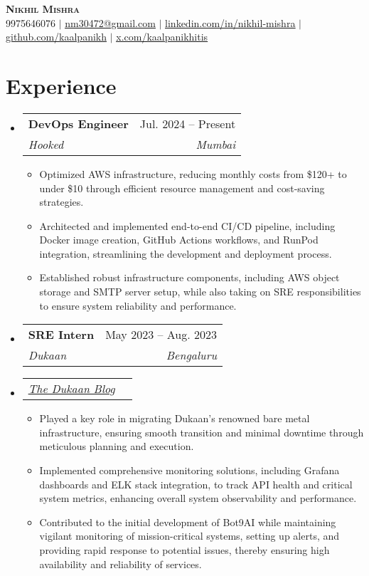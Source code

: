 \documentclass[letterpaper,11pt]{article}
\makeatletter
\newcommand{\resumeItem}[1]{
  \item\small{
    {#1 \vspace{-2pt}}
  }
}
\newcommand{\resumeSubheading}[4]{
  \vspace{-2pt}\item
    \begin{tabular*}{0.97\textwidth}[t]{l@{\extracolsep{\fill}}r}
      \textbf{#1} & #2 \\
      \textit{\small#3} & \textit{\small #4} \\
    \end{tabular*}\vspace{-7pt}
}
\newcommand{\resumeSubSubheading}[2]{
    \item
    \begin{tabular*}{0.97\textwidth}{l@{\extracolsep{\fill}}r}
      \textit{\small#1} & \textit{\small #2} \\
    \end{tabular*}\vspace{-7pt}
}
\newcommand{\resumeSubHeadingListStart}{\begin{itemize}[leftmargin=0.15in, label={}]}
\newcommand{\resumeSubHeadingListEnd}{\end{itemize}}
\newcommand{\resumeItemListStart}{\begin{itemize}}
\newcommand{\resumeItemListEnd}{\end{itemize}\vspace{-5pt}}
\makeatother
\begin{document}

\begin{center}
    \textbf{\Huge \scshape Nikhil Mishra} \\ \vspace{1pt}
    \small  9975646076 $|$ \href{mailto:nm30472@gmail.com}{\underline{nm30472@gmail.com}} $|$ 
    \href{https://linkedin.com/in/nikhil-mishra-392503306}{\underline{linkedin.com/in/nikhil-mishra}} $|$
    \href{https://github.com/kaalpanikh}{\underline{github.com/kaalpanikh}} $|$
    \href{https://x.com/kaalpanikhitis}{\underline{x.com/kaalpanikhitis}}
\end{center}

\section{Experience}
  \resumeSubHeadingListStart
    \resumeSubheading
      {DevOps Engineer}{Jul. 2024 -- Present}
      {Hooked}{Mumbai}
      \resumeItemListStart
        \resumeItem{Optimized AWS infrastructure, reducing monthly costs from \$120+ to under \$10 through efficient resource management and cost-saving strategies.}
        \resumeItem{Architected and implemented end-to-end CI/CD pipeline, including Docker image creation, GitHub Actions workflows, and RunPod integration, streamlining the development and deployment process.}
        \resumeItem{Established robust infrastructure components, including AWS object storage and SMTP server setup, while also taking on SRE responsibilities to ensure system reliability and performance.}
      \resumeItemListEnd
    
    \resumeSubheading
      {SRE Intern}{May 2023 -- Aug. 2023}
      {Dukaan}{Bengaluru}
    \resumeSubSubheading
      {\href{https://nikhilmishra.notion.site/SRE-INTERN-AT-DUKAAN-2d242bb787194466bfe3577b80735100?pvs=4}{\underline{The Dukaan Blog}}}{}
      \resumeItemListStart
        \resumeItem{Played a key role in migrating Dukaan's renowned bare metal infrastructure, ensuring smooth transition and minimal downtime through meticulous planning and execution.}
        \resumeItem{Implemented comprehensive monitoring solutions, including Grafana dashboards and ELK stack integration, to track API health and critical system metrics, enhancing overall system observability and performance.}
        \resumeItem{Contributed to the initial development of Bot9AI while maintaining vigilant monitoring of mission-critical systems, setting up alerts, and providing rapid response to potential issues, thereby ensuring high availability and reliability of services.}
      \resumeItemListEnd
  \resumeSubHeadingListEnd
\end{document}
